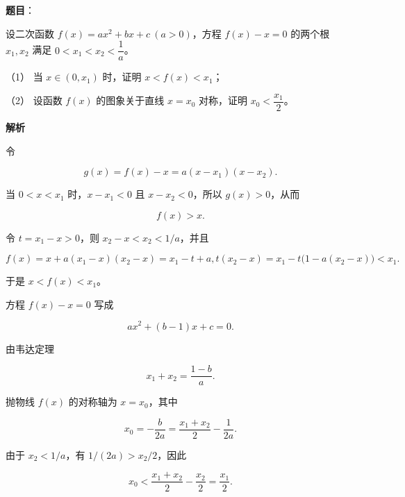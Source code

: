 \begin{answer}

\textbf{题目}：

设二次函数 $f(x)=ax^2+bx+c\ (a>0)$，方程 $f(x)-x=0$ 的两个根 $x_1,x_2$ 满足 $0<x_1<x_2<\dfrac1a$。

（1） 当 $x\in(0,x_1)$ 时，证明 $x<f(x)<x_1$；

（2） 设函数 $f(x)$ 的图象关于直线 $x=x_0$ 对称，证明 $x_0<\dfrac{x_1}{2}$。

\textbf{解析}


令

\nopagebreak[4]
\[
g(x)=f(x)-x=a(x-x_1)(x-x_2).
\]

当 $0<x<x_1$ 时，$x-x_1<0$ 且 $x-x_2<0$，所以 $g(x)>0$，从而

\nopagebreak[4]
\[
f(x)>x.
\]

令 $t=x_1-x>0$，则 $x_2-x<x_2<1/a$，并且

\nopagebreak[4]
\[
f(x)=x+a(x_1-x)(x_2-x)
=x_1-t+a,t(x_2-x)
=x_1-t\bigl(1-a(x_2-x)\bigr)<x_1.
\]

于是 $x<f(x)<x_1$。


方程 $f(x)-x=0$ 写成

\nopagebreak[4]
\[
ax^2+(b-1)x+c=0.
\]

由韦达定理

\nopagebreak[4]
\[
x_1+x_2=\frac{1-b}{a}.
\]

抛物线 $f(x)$ 的对称轴为 $x=x_0$，其中

\nopagebreak[4]
\[
x_0=-\frac b{2a}
=\frac{x_1+x_2}{2}-\frac1{2a}.
\]

由于 $x_2<1/a$，有 $1/(2a)>x_2/2$，因此

\nopagebreak[4]
\[
x_0<\frac{x_1+x_2}{2}-\frac{x_2}{2}=\frac{x_1}{2}.
\]



\end{answer}

